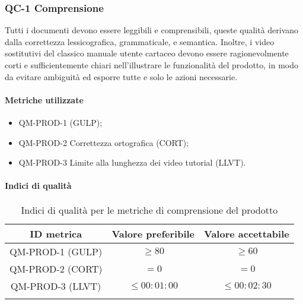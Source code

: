 \subsubsection{QC-1 Comprensione}
Tutti i documenti devono essere leggibili e comprensibili, queste qualità derivano dalla correttezza lessicografica, grammaticale, e semantica.
\newline
Inoltre, i video sostitutivi del classico manuale utente cartaceo devono essere ragionevolmente corti e sufficientemente chiari nell'illustrare le funzionalità del prodotto, in modo da evitare ambiguità ed esporre tutte e solo le azioni necessarie.
	
	\paragraph{Metriche utilizzate}
	\begin{itemize}
		\item QM-PROD-1  (GULP);
    	\item QM-PROD-2 Correttezza ortografica (CORT);
    	\item QM-PROD-3 Limite alla lunghezza dei video tutorial (LLVT).
	\end{itemize}

	\paragraph{Indici di qualità}
	\begin{center}
		\begin{longtable}{|c|c|c|}
			\hline
			\rowcolor{lighter-grayer}
			\textbf{ID metrica} & \textbf{Valore preferibile} & \textbf{Valore accettabile} \\
			\hline 
			\endhead
			QM-PROD-1 (GULP) & \(\ge 80\) & \(\ge 60\) \\
 		  	\hline
			QM-PROD-2 (CORT) & \(= 0\) & \(= 0\) \\
			\hline
			QM-PROD-3 (LLVT) & \(\le 00:01:00\)  & \(\le 00:02:30\) \\
			\hline
			\caption{Indici di qualità per le metriche di comprensione del prodotto}
		\end{longtable}
	\end{center}
